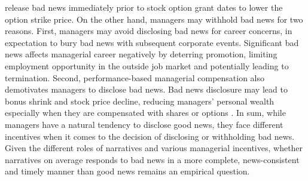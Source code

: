 \documentclass[a4paper]{article}
\begin{document}
\begin{spacing}{2}
release bad news immediately prior to stock option grant dates to lower the option strike price. On the other hand, managers may withhold bad news for two reasons. First, managers may avoid disclosing bad news for career concerns, in expectation to bury bad news with subsequent corporate events. Significant bad news affects managerial career negatively by deterring promotion, limiting employment opportunity in the outside job market and potentially leading to termination. Second, performance-based managerial compensation also demotivates managers to disclose bad news. Bad news disclosure may lead to bonus shrink and stock price decline, reducing managers' personal wealth especially when they are compensated with shares or options \cite{kothariManagersWithholdBad2009}. In sum, while managers have a natural tendency to disclose good news, they face different incentives when it comes to the decision of disclosing or withholding bad news. Given the different roles of narratives and various managerial incentives, whether narratives on average responds to bad news in a more complete, news-consistent and timely manner than good news remains an empirical question. 


\end{spacing}
\end{document}
